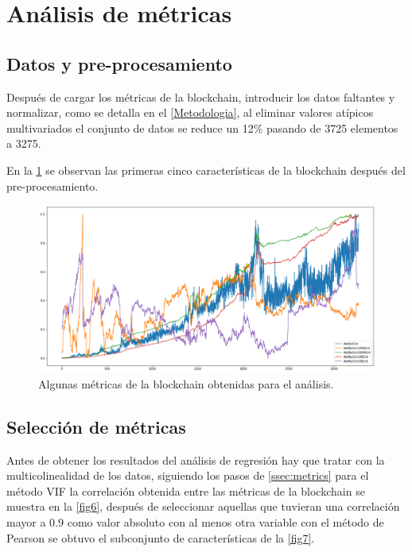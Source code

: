\section{Análisis de métricas}

\subsection{Datos y pre-procesamiento}
Después de cargar los métricas de la blockchain, introducir los datos faltantes y normalizar, como se detalla en el \cref{Metodologia}, al eliminar valores atípicos multivariados el conjunto de datos se reduce un 12\%  pasando de 3725 elementos a 3275.

En la \cref{fig5} se observan las primeras cinco características de la blockchain después del pre-procesamiento.

\begin{figure}[!h]
	\centering
	\includegraphics[scale=0.34]{Chapter5/metrics_1.png}
	\caption{Algunas métricas de la blockchain obtenidas para el análisis.}
	\label{fig5}
\end{figure}

\subsection{Selección de métricas}

Antes de obtener los resultados del análisis de regresión hay que tratar con la multicolinealidad de los datos, siguiendo los pasos de \cref{ssec:metrics} para el método VIF la correlación obtenida entre las métricas de la blockchain se muestra en la \cref{fig6}, después de seleccionar aquellas que tuvieran una correlación mayor a $0.9$ como valor absoluto con al menos otra variable con el método de Pearson se obtuvo el subconjunto de características de la \cref{fig7}. 


